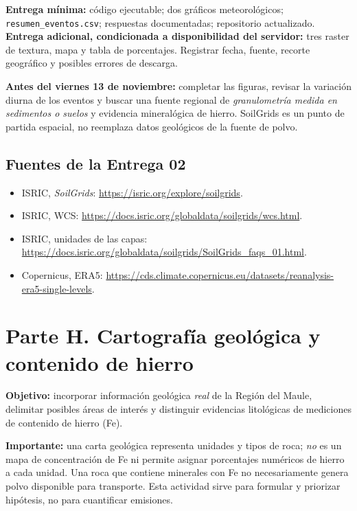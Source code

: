 \documentclass[11pt,a4paper]{article}
\begin{document}
\textbf{Entrega mínima:} código ejecutable; dos gráficos meteorológicos;
\texttt{resumen\_eventos.csv}; respuestas documentadas; repositorio actualizado.
\textbf{Entrega adicional, condicionada a disponibilidad del servidor:}
tres raster de textura, mapa y tabla de porcentajes. Registrar fecha,
fuente, recorte geográfico y posibles errores de descarga.

\textbf{Antes del viernes 13 de noviembre:} completar las figuras, revisar
la variación diurna de los eventos y buscar una fuente regional de
\emph{granulometría medida en sedimentos o suelos} y evidencia mineralógica
de hierro. SoilGrids es un punto de partida espacial, no reemplaza datos
geológicos de la fuente de polvo.

\subsection*{Fuentes de la Entrega 02}
\begin{itemize}[nosep]
\item ISRIC, \emph{SoilGrids}: \url{https://isric.org/explore/soilgrids}.
\item ISRIC, WCS: \url{https://docs.isric.org/globaldata/soilgrids/wcs.html}.
\item ISRIC, unidades de las capas: \url{https://docs.isric.org/globaldata/soilgrids/SoilGrids_faqs_01.html}.
\item Copernicus, ERA5: \url{https://cds.climate.copernicus.eu/datasets/reanalysis-era5-single-levels}.
\end{itemize}



\section{Parte H. Cartografía geológica y contenido de hierro}
\textbf{Objetivo:} incorporar información geológica \emph{real} de la Región
 del Maule, delimitar posibles áreas de interés y distinguir evidencias
 litológicas de mediciones de contenido de hierro (Fe).

\textbf{Importante:} una carta geológica representa unidades y tipos de roca;
\emph{no} es un mapa de concentración de Fe ni permite asignar porcentajes
numéricos de hierro a cada unidad. Una roca que contiene minerales con Fe
no necesariamente genera polvo disponible para transporte. Esta actividad
sirve para formular y priorizar hipótesis, no para cuantificar emisiones.
\end{document}
